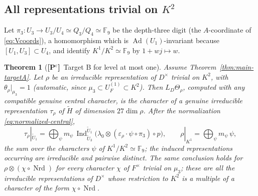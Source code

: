 \documentclass[11pt]{article}
\newcommand{\Fq}{\mathbb F}
\newcommand{\Nrd}{\operatorname{Nrd}}
\newcommand{\Ind}{\operatorname{Ind}}
\newcommand{\Ad}{\operatorname{Ad}}
\newcommand{\tH}{\widetilde H}
\newcommand{\tU}{\widetilde U}
\newcommand{\Pctag}{\textnormal{\textbf{[P$^{\mathrm c}$]}}}
\theoremstyle{plain}
\newtheorem{theorem}{Theorem}[section]
\theoremstyle{definition}
\begin{document}
\subsection{All representations trivial on $K^2$}
Let $\pi_3:U_3\to U_3/U_4\simeq Q_3/Q_4\simeq\Fq_9$ be the depth-three
digit (the $A$-coordinate of \eqref{eq:Vcoords}), a homomorphism which
is $\Ad(U_1)$-invariant because $[U_1,U_3]\subset U_4$, and identify
$K^1/K^2\simeq\Fq_9$ by $1+wj\mapsto w$.

\begin{theorem}[\Pctag\ Target B for level at most one]\label{thm:levelone}
Assume Theorem~\ref{thm:main-targetA}.  Let $\rho$ be an irreducible
representation of $D^\times$ trivial on $K^2$, with
$\theta_\rho|_{\mu_3}=1$ (automatic, since $\mu_3\subset U_F^{(1)}\subset K^2$).
Then $L_D\Theta_\rho$, computed with any compatible genuine central
character, is the character of a genuine irreducible representation
$\tau_\rho$ of $\tH$ of dimension $27\dim\rho$.  After the normalization
\eqref{eq:normalized-central},
\[
 \tau_\rho|_{\tU_1}=\bigoplus_{\psi}m_\psi\,\Ind_{\tU_3}^{\tU_1}\bigl(\lambda_0\otimes(\varepsilon_\rho\cdot\psi\circ\pi_3)\circ p\bigr),
 \qquad \rho|_{K^1}=\bigoplus_\psi m_\psi\,\psi ,
\]
the sum over the characters $\psi$ of $K^1/K^2\simeq\Fq_9$; the
induced representations occurring are irreducible and pairwise
distinct.
The same conclusion holds for $\rho\otimes(\chi\circ\Nrd)$ for every
character $\chi$ of $F^\times$ trivial on $\mu_3$; these are all the
irreducible representations of $D^\times$ whose restriction to $K^2$
is a multiple of a character of the form $\chi\circ\Nrd$.
\end{theorem}
\end{document}
